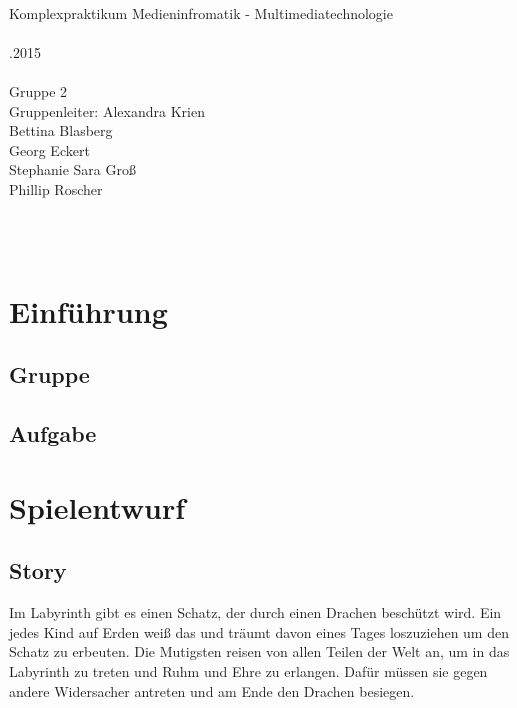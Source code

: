 \documentclass[10pt,a4paper,notitlepage]{report}
\author{Group2}
\begin{document}
\\
		{\large Komplexpraktikum Medieninfromatik - Multimediatechnologie\\}
\
\\
.2015\\\
\\
\centering 	Gruppe 2\\
		Gruppenleiter: Alexandra Krien\\
		Bettina Blasberg\\
		Georg Eckert\\
		Stephanie Sara Groß\\
		Phillip Roscher\\\

\tableofcontents
\clearpage\
\\
\begin{flushleft}
\chapter[Einführung]{Einführung}
\section{Gruppe}
\section{Aufgabe}

\chapter{Spielentwurf}
\section{Story}
Im Labyrinth gibt es einen Schatz, der durch einen Drachen beschützt wird. Ein jedes Kind auf Erden weiß das und träumt davon eines Tages loszuziehen um den Schatz zu erbeuten. Die Mutigsten reisen von allen Teilen der Welt an, um in das Labyrinth zu treten und Ruhm und Ehre zu erlangen. Dafür müssen sie gegen andere Widersacher antreten und am Ende den Drachen besiegen.\\

\end{flushleft}
\end{document}
